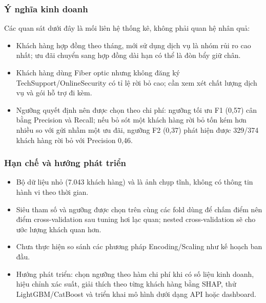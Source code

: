 \subsubsection{Ý nghĩa kinh doanh}
Các quan sát dưới đây là mối liên hệ thống kê, không phải quan hệ nhân quả:
\begin{itemize}
    \item Khách hàng hợp đồng theo tháng, mới sử dụng dịch vụ là nhóm rủi ro cao nhất; ưu đãi chuyển sang hợp đồng dài hạn có thể là đòn bẩy giữ chân.
    \item Khách hàng dùng Fiber optic nhưng không đăng ký TechSupport/OnlineSecurity có tỉ lệ rời bỏ cao; cần xem xét chất lượng dịch vụ và gói hỗ trợ đi kèm.
    \item Ngưỡng quyết định nên được chọn theo chi phí: ngưỡng tối ưu F1 (0,57) cân bằng Precision và Recall; nếu bỏ sót một khách hàng rời bỏ tốn kém hơn nhiều so với gửi nhầm một ưu đãi, ngưỡng F2 (0,37) phát hiện được 329/374 khách hàng rời bỏ với Precision 0,46.
\end{itemize}

\subsubsection{Hạn chế và hướng phát triển}
\begin{itemize}
    \item Bộ dữ liệu nhỏ (7.043 khách hàng) và là ảnh chụp tĩnh, không có thông tin hành vi theo thời gian.
    \item Siêu tham số và ngưỡng được chọn trên cùng các fold dùng để chấm điểm nên điểm cross-validation sau tuning hơi lạc quan; nested cross-validation sẽ cho ước lượng khách quan hơn.
    \item Chưa thực hiện so sánh các phương pháp Encoding/Scaling như kế hoạch ban đầu.
    \item Hướng phát triển: chọn ngưỡng theo hàm chi phí khi có số liệu kinh doanh, hiệu chỉnh xác suất, giải thích theo từng khách hàng bằng SHAP, thử LightGBM/CatBoost và triển khai mô hình dưới dạng API hoặc dashboard.
\end{itemize}
